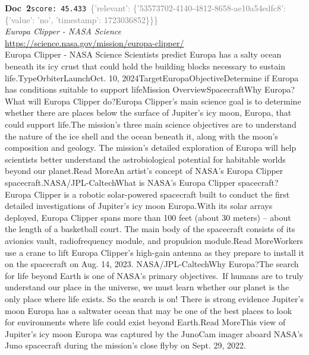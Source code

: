 \documentclass[a4paper,11pt]{article}
\begin{document}
\begin{docenv}
{\footnotesize\textcolor{doccolor}{\textbf{Doc~2}}}\hfill{\tiny\texttt{score:~45.433}}\ {\tiny\textcolor{gray}{\{'relevant': \{'53573702-4140-4812-8658-ae10a54edfc8': \{'value': 'no', 'timestamp': 1723036852\}\}\}}}\\[3pt]
{\small\textit{Europa Clipper - NASA Science}}\\[2pt]
{\tiny\url{https://science.nasa.gov/mission/europa-clipper/}}\\[4pt]
{\footnotesize Europa Clipper - NASA Science
Scientists predict Europa has a salty ocean beneath its icy crust that could hold the building blocks necessary to sustain life.TypeOrbiterLaunchOct. 10, 2024TargetEuropaObjectiveDetermine if Europa has conditions suitable to support lifeMission OverviewSpacecraftWhy Europa?What will Europa Clipper do?Europa Clipper’s main science goal is to determine whether there are places below the surface of Jupiter’s icy moon, Europa, that could support life.The mission’s three main science objectives are to understand the nature of the ice shell and the ocean beneath it, along with the moon’s composition and geology. The mission’s detailed exploration of Europa will help scientists better understand the astrobiological potential for habitable worlds beyond our planet.Read MoreAn artist's concept of NASA’s Europa Clipper spacecraft.NASA/JPL-CaltechWhat is NASA’s Europa Clipper spacecraft?Europa Clipper is a robotic solar-powered spacecraft built to conduct the first detailed investigations of Jupiter's icy moon Europa.With its solar arrays deployed, Europa Clipper spans more than 100 feet (about 30 meters) – about the length of a basketball court. The main body of the spacecraft consists of its avionics vault, radiofrequency module, and propulsion module.Read MoreWorkers use a crane to lift Europa Clipper's high-gain antenna as they prepare to install it on the spacecraft on Aug. 14, 2023. NASA/JPL-CaltechWhy Europa?The search for life beyond Earth is one of NASA’s primary objectives. If humans are to truly understand our place in the universe, we must learn whether our planet is the only place where life exists. So the search is on! There is strong evidence Jupiter's moon Europa has a saltwater ocean that may be one of the best places to look for environments where life could exist beyond Earth.Read MoreThis view of Jupiter’s icy moon Europa was captured by the JunoCam imager aboard NASA’s Juno spacecraft during the mission’s close flyby on Sept. 29, 2022.}
\end{docenv}
\end{document}
